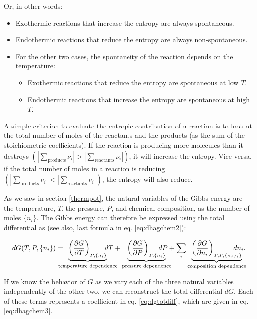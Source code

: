 \documentclass[
  9pt,
]{extbook}
\providecommand{\tightlist}{%
  \setlength{\itemsep}{0pt}\setlength{\parskip}{0pt}}
\theoremstyle{definition}
\theoremstyle{definition}
\theoremstyle{definition}
\theoremstyle{definition}
\theoremstyle{remark}
\begin{document}
Or, in other words:

\begin{itemize}
\tightlist
\item
  Exothermic reactions that increase the entropy are always spontaneous.
\item
  Endothermic reactions that reduce the entropy are always non-spontaneous.
\item
  For the other two cases, the spontaneity of the reaction depends on the temperature:

  \begin{itemize}
  \tightlist
  \item
    Exothermic reactions that reduce the entropy are spontaneous at low \(T\).
  \item
    Endothermic reactions that increase the entropy are spontaneous at high \(T\).
  \end{itemize}
\end{itemize}

A simple criterion to evaluate the entropic contribution of a reaction is to look at the total number of moles of the reactants and the products (as the sum of the stoichiometric coefficients). If the reaction is producing more molecules than it destroys \(\left( \left| \sum_\text{products} \nu_i \right| > \left| \sum_\text{reactants} \nu_i \right| \right)\), it will increase the entropy. Vice versa, if the total number of moles in a reaction is reducing \(\left( \left| \sum_\text{products} \nu_i \right| < \left| \sum_\text{reactants} \nu_i \right| \right)\), the entropy will also reduce.

As we saw in section \ref{thermpot}, the natural variables of the Gibbs energy are the temperature, \(T\), the pressure, \(P\), and chemical composition, as the number of moles \(\{n_i\}\). The Gibbs energy can therefore be expressed using the total differential as (see also, last formula in eq. \eqref{eq:dhagchem2}):

\begin{equation}
dG(T,P,\{n_i\}) = \mkern-18mu \underbrace{\left(\frac{\partial G}{\partial T} \right)_{P,\{n_i\}}}_{\text{temperature dependence}} \mkern-36mu dT + \underbrace{\left(\frac{\partial G}{\partial P} \right)_{T,\{n_i\}}}_{\text{pressure dependence}} \mkern-36mu dP + \sum_i \underbrace{\left(\frac{\partial G}{\partial n_i} \right)_{T,P,\{n_{j \neq i}\}}}_{\text{composition dependence}} \mkern-36mu dn_i.
\label{eq:dgtotdiff}
\end{equation}

If we know the behavior of \(G\) as we vary each of the three natural variables independently of the other two, we can reconstruct the total differential \(dG\). Each of these terms represents a coefficient in eq. \eqref{eq:dgtotdiff}, which are given in eq. \eqref{eq:dhagchem3}.
\end{document}
